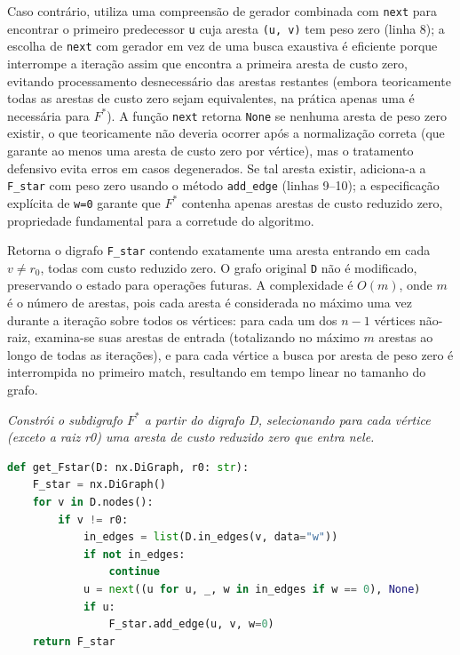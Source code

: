 Caso contrário, utiliza uma compreensão de gerador combinada com \texttt{next} para encontrar o primeiro predecessor \texttt{u} cuja aresta \texttt{(u, v)} tem peso zero (linha 8); a escolha de \texttt{next} com gerador em vez de uma busca exaustiva é eficiente porque interrompe a iteração assim que encontra a primeira aresta de custo zero, evitando processamento desnecessário das arestas restantes (embora teoricamente todas as arestas de custo zero sejam equivalentes, na prática apenas uma é necessária para \(F^*\)). A função \texttt{next} retorna \texttt{None} se nenhuma aresta de peso zero existir, o que teoricamente não deveria ocorrer após a normalização correta (que garante ao menos uma aresta de custo zero por vértice), mas o tratamento defensivo evita erros em casos degenerados. Se tal aresta existir, adiciona-a a \texttt{F\_star} com peso zero usando o método \texttt{add\_edge} (linhas 9--10); a especificação explícita de \texttt{w=0} garante que \(F^*\) contenha apenas arestas de custo reduzido zero, propriedade fundamental para a corretude do algoritmo.

Retorna o digrafo \texttt{F\_star} contendo exatamente uma aresta entrando em cada \(v\neq r_0\), todas com custo reduzido zero. O grafo original \texttt{D} não é modificado, preservando o estado para operações futuras. A complexidade é \(O(m)\), onde \(m\) é o número de arestas, pois cada aresta é considerada no máximo uma vez durante a iteração sobre todos os vértices: para cada um dos \(n-1\) vértices não-raiz, examina-se suas arestas de entrada (totalizando no máximo \(m\) arestas ao longo de todas as iterações), e para cada vértice a busca por aresta de peso zero é interrompida no primeiro match, resultando em tempo linear no tamanho do grafo.

\begin{tcolorbox}[
        enhanced, breakable,
        colframe=blue!60!black, colback=blue!2,
        colbacktitle=blue!15, coltitle=black,
        title={Construção de F star },
        boxed title style={sharp corners, boxrule=0.6pt},
        sharp corners, boxrule=0.6pt
    ]
    \emph{Constrói o subdigrafo $F^*$ a partir do digrafo D, selecionando para cada vértice (exceto a raiz r0) uma aresta de custo reduzido zero que entra nele.}
    \tcblower
    \begin{lstlisting}[mathescape=true, language=Python]
def get_Fstar(D: nx.DiGraph, r0: str):
    F_star = nx.DiGraph()
    for v in D.nodes():
        if v != r0:
            in_edges = list(D.in_edges(v, data="w"))
            if not in_edges:
                continue
            u = next((u for u, _, w in in_edges if w == 0), None)
            if u:
                F_star.add_edge(u, v, w=0)
    return F_star
\end{lstlisting}
\end{tcolorbox}

